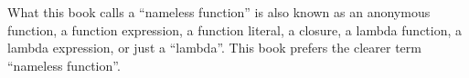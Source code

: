 What this book calls a \textsf{``}nameless function\textsf{''} is also known as an
anonymous function,
a function expression, a function literal, a closure, a lambda
function, a lambda expression, or just a \textsf{``}lambda\textsf{''}. This book prefers
the clearer term \textsf{``}nameless function\textsf{''}.
